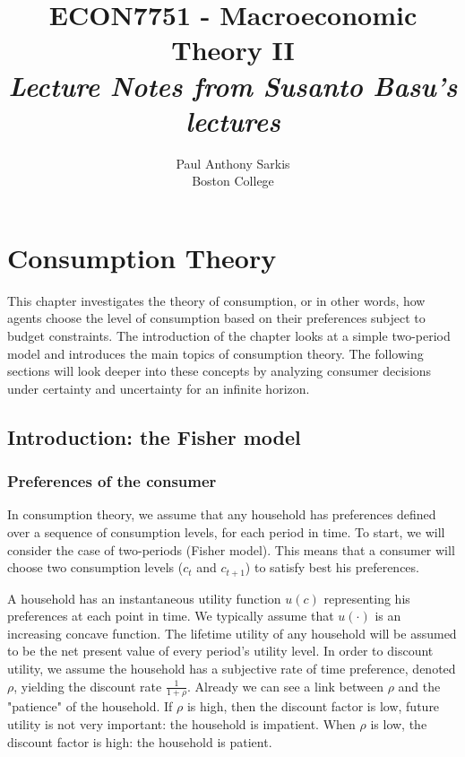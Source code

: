 \documentclass[12pt]{report}
\begin{document}
\date{}
\title{\textbf{\huge{ECON7751 - Macroeconomic Theory II}}\\ \textit{Lecture Notes from Susanto Basu's lectures}}
\author{Paul Anthony Sarkis\\ Boston College} 
 
\maketitle

\tableofcontents

\chapter{Consumption Theory}

This chapter investigates the theory of consumption, or in other words, how agents choose the level of consumption based on their preferences subject to budget constraints. The introduction of the chapter looks at a simple two-period model and introduces the main topics of consumption theory. The following sections will look deeper into these concepts by analyzing consumer decisions under certainty and uncertainty for an infinite horizon.

\section{Introduction: the Fisher model}

\subsection{Preferences of the consumer}

In consumption theory, we assume that any household has preferences defined over a sequence of consumption levels, for each period in time. To start, we will consider the case of two-periods (Fisher model). This means that a consumer will choose two consumption levels ($c_t$ and $c_{t+1}$) to satisfy best his preferences.

A household has an instantaneous utility function $u(c)$ representing his preferences at each point in time. We typically assume that $u(\cdot)$ is an increasing concave function. The lifetime utility of any household will be assumed to be the net present value of every period's utility level. In order to discount utility, we assume the household has a subjective rate of time preference, denoted $\rho$, yielding the discount rate $\frac{1}{1+\rho}$. Already we can see a link between $\rho$ and the "patience" of the household. If $\rho$ is high, then the discount factor is low, future utility is not very important: the household is impatient. When $\rho$ is low, the discount factor is high: the household is patient.
\end{document}
